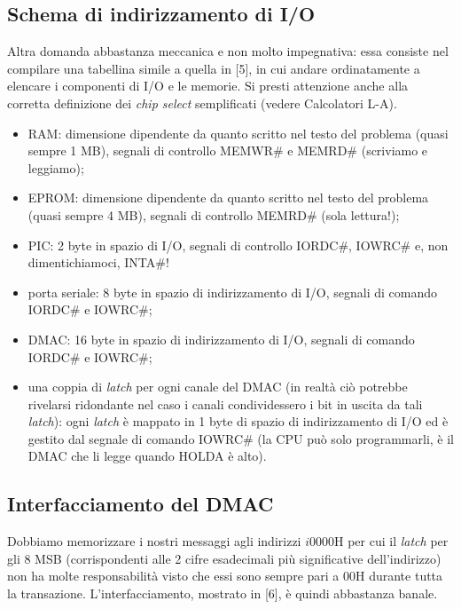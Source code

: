 \subsection{Schema di indirizzamento di I/O}
Altra domanda abbastanza meccanica e non molto impegnativa: essa consiste nel compilare una tabellina simile a quella in [5], in cui andare ordinatamente a elencare i componenti di I/O e le memorie. Si presti attenzione anche alla corretta definizione dei \textit{chip select} semplificati (vedere Calcolatori L-A).
\begin{itemize}
\item RAM: dimensione dipendente da quanto scritto nel testo del problema (quasi sempre 1 MB), segnali di controllo MEMWR\# e MEMRD\# (scriviamo e leggiamo);
\item EPROM: dimensione dipendente da quanto scritto nel testo del problema (quasi sempre 4 MB), segnali di controllo MEMRD\# (sola lettura!);
\item PIC: 2 byte in spazio di I/O, segnali di controllo IORDC\#, IOWRC\# e, non dimentichiamoci, INTA\#!
\item porta seriale: 8 byte in spazio di indirizzamento di I/O, segnali di comando IORDC\# e IOWRC\#;
\item DMAC: 16 byte in spazio di indirizzamento di I/O, segnali di comando IORDC\# e IOWRC\#;
\item una coppia di \textit{latch} per ogni canale del DMAC (in realtà ciò potrebbe rivelarsi ridondante nel caso i canali condividessero i bit in uscita da tali \textit{latch}): ogni \textit{latch} è mappato in 1 byte di spazio di indirizzamento di I/O ed è gestito dal segnale di comando IOWRC\# (la CPU può solo programmarli, è il DMAC che li legge quando HOLDA è alto).

\end{itemize}

\subsection{Interfacciamento del DMAC}

Dobbiamo memorizzare i nostri messaggi agli indirizzi $i0000$H per cui il \textit{latch} per gli 8 MSB (corrispondenti alle 2 cifre esadecimali più significative dell'indirizzo) non ha molte responsabilità visto che essi sono sempre pari a 00H durante tutta la transazione. L'interfacciamento, mostrato in [6], è quindi abbastanza banale.

